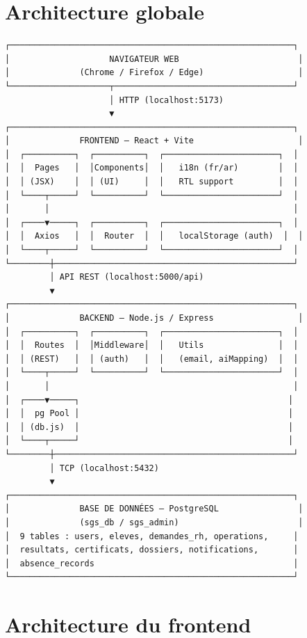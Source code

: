 \documentclass[12pt,a4paper]{report}
\begin{document}
\section{Architecture globale}

\begin{verbatim}
┌─────────────────────────────────────────────────────────┐
│                    NAVIGATEUR WEB                        │
│              (Chrome / Firefox / Edge)                   │
└────────────────────┬────────────────────────────────────┘
                     │ HTTP (localhost:5173)
                     ▼
┌─────────────────────────────────────────────────────────┐
│              FRONTEND — React + Vite                     │
│  ┌──────────┐  ┌──────────┐  ┌───────────────────────┐  │
│  │  Pages   │  │Components│  │   i18n (fr/ar)        │  │
│  │ (JSX)    │  │ (UI)     │  │   RTL support         │  │
│  └────┬─────┘  └──────────┘  └───────────────────────┘  │
│       │                                                 │
│  ┌────▼─────┐  ┌──────────┐  ┌───────────────────────┐  │
│  │  Axios   │  │  Router  │  │   localStorage (auth)  │  │
│  └────┬─────┘  └──────────┘  └───────────────────────┘  │
└────────┼────────────────────────────────────────────────┘
         │ API REST (localhost:5000/api)
         ▼
┌─────────────────────────────────────────────────────────┐
│              BACKEND — Node.js / Express                 │
│  ┌──────────┐  ┌──────────┐  ┌───────────────────────┐  │
│  │  Routes  │  │Middleware│  │   Utils               │  │
│  │ (REST)   │  │ (auth)   │  │   (email, aiMapping)  │  │
│  └────┬─────┘  └──────────┘  └───────────────────────┘  │
│       │                                                 │
│  ┌────▼─────┐                                          │
│  │  pg Pool │                                          │
│  │ (db.js)  │                                          │
│  └────┬─────┘                                          │
└────────┼────────────────────────────────────────────────┘
         │ TCP (localhost:5432)
         ▼
┌─────────────────────────────────────────────────────────┐
│              BASE DE DONNÉES — PostgreSQL                │
│              (sgs_db / sgs_admin)                        │
│  9 tables : users, eleves, demandes_rh, operations,     │
│  resultats, certificats, dossiers, notifications,       │
│  absence_records                                        │
└─────────────────────────────────────────────────────────┘
\end{verbatim}

\section{Architecture du frontend}
\end{document}

